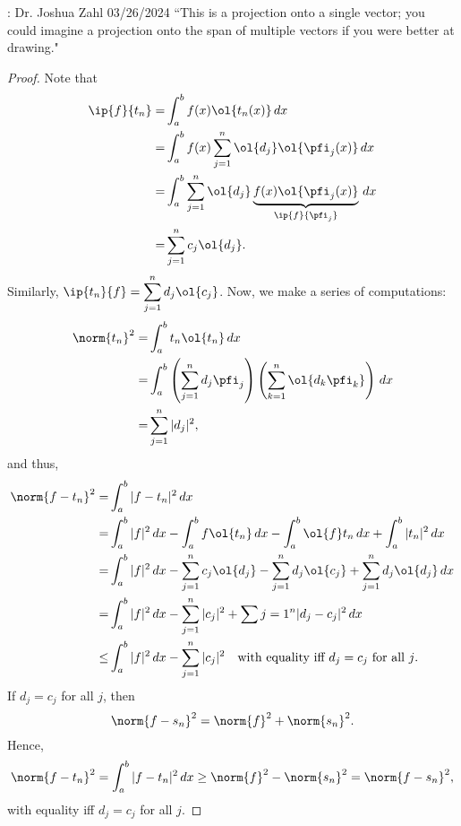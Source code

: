 \begin{nquote}{: Dr. Joshua Zahl 03/26/2024}
    ``This is a projection onto a single vector; you could imagine a projection onto the span of multiple vectors if you were better at drawing."
\end{nquote}
\begin{proof}
    Note that
    \begin{align*} 
        \ip{f}{t_n}=&\int_a^b f(x)\ol{t_n(x)} \, dx\\
                   =&\int_a^b f(x)\sum_{j=1}^n \ol{d_j}\ol{\pfi_j(x)} \, dx\\
                   =&\int_a^b \sum_{j=1}^n \ol{d_j}\underbrace{f(x)\ol{\pfi_j(x)}}_{\ip{f}{\pfi_j}} \, dx\\
                   =&\sum_{j=1}^n c_j\ol{d_j}.
    \end{align*}
    Similarly, \(\ip{t_n}{f}=\displaystyle\sum_{j=1}^n d_j\ol{c_j}\). Now, we make a series of computations:
    \begin{align*} 
        \norm{t_n}^2=&\int_a^b t_n\ol{t_n} \, dx\\
                    =&\int_a^b \left(\sum_{j=1}^n d_j\pfi_j\right)\left(\sum_{k=1}^n \ol{d_k\pfi_k}\right) \, dx\\
                    =&\sum_{j=1}^n |d_j|^2,
    \end{align*}
    and thus, 
    \begin{align*} 
        \norm{f-t_n}^2=&\int_a^b |f-t_n|^2 \, dx\\
                      =&\int_a^b |f|^2 \, dx -\int_a^b f\ol{t_n} \, dx-\int_a^b \ol{f}t_n \, dx+\int_a^b |t_n|^2 \, dx\\
                      =&\int_a^b |f|^2 \, dx -\sum_{j=1}^n c_j\ol{d_j}-\sum_{j=1}^n d_j\ol{c_j}+\sum_{j=1}^nd_j\ol{d_j} \, dx\\
                      =&\int_a^b |f|^2 \, dx -\sum_{j=1}^n |c_j|^2+\sum{j=1}^n |d_j-c_j|^2 \, dx\\
                   \leq&\int_a^b |f|^2 \, dx -\sum_{j=1}^n |c_j|^2\quad\text{with equality iff \(d_j=c_j\) for all \(j\).}
    \end{align*}
    If \(d_j=c_j\) for all \(j\), then
    \begin{equation} 
        \norm{f-s_n}^2=\norm{f}^2+\norm{s_n}^2\label{d_j=c_j}.
    \end{equation}
    Hence,
    \begin{equation*} 
        \norm{f-t_n}^2=\int_a^b |f-t_n|^2 \, dx\geq \norm{f}^2-\norm{s_n}^2=\norm{f-s_n}^2,
    \end{equation*}
    with equality iff \(d_j=c_j\) for all \(j\).
\end{proof}
